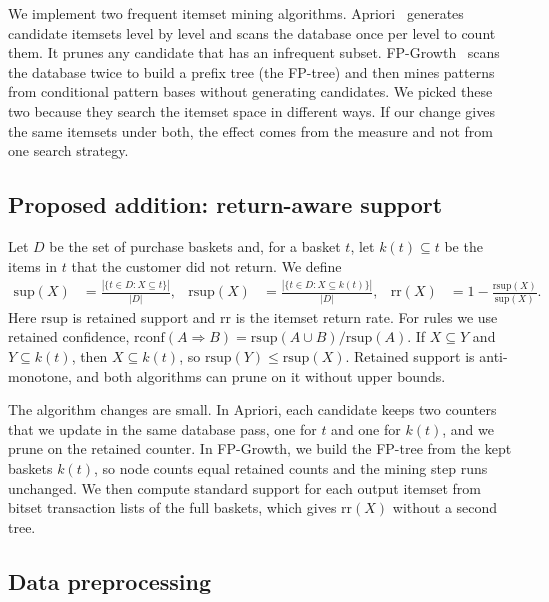 \documentclass[11pt,a4paper]{article}
\newcommand{\Sup}{\mathrm{sup}}
\newcommand{\RSup}{\mathrm{rsup}}
\begin{document}
We implement two frequent itemset mining algorithms. Apriori~\cite{agrawal1994} generates candidate itemsets level by level and scans the database once per level to count them. It prunes any candidate that has an infrequent subset. FP-Growth~\cite{han2000} scans the database twice to build a prefix tree (the FP-tree) and then mines patterns from conditional pattern bases without generating candidates. We picked these two because they search the itemset space in different ways. If our change gives the same itemsets under both, the effect comes from the measure and not from one search strategy.

\subsection*{Proposed addition: return-aware support}

Let $D$ be the set of purchase baskets and, for a basket $t$, let $k(t) \subseteq t$ be the items in $t$ that the customer did not return. We define
\begin{align*}
\Sup(X)  &= \frac{|\{t \in D : X \subseteq t\}|}{|D|}, &
\RSup(X) &= \frac{|\{t \in D : X \subseteq k(t)\}|}{|D|}, &
\mathrm{rr}(X) &= 1 - \frac{\RSup(X)}{\Sup(X)}.
\end{align*}
Here $\RSup$ is retained support and $\mathrm{rr}$ is the itemset return rate. For rules we use retained confidence, $\mathrm{rconf}(A \Rightarrow B) = \RSup(A \cup B) / \RSup(A)$. If $X \subseteq Y$ and $Y \subseteq k(t)$, then $X \subseteq k(t)$, so $\RSup(Y) \le \RSup(X)$. Retained support is anti-monotone, and both algorithms can prune on it without upper bounds.

The algorithm changes are small. In Apriori, each candidate keeps two counters that we update in the same database pass, one for $t$ and one for $k(t)$, and we prune on the retained counter. In FP-Growth, we build the FP-tree from the kept baskets $k(t)$, so node counts equal retained counts and the mining step runs unchanged. We then compute standard support for each output itemset from bitset transaction lists of the full baskets, which gives $\mathrm{rr}(X)$ without a second tree.

\subsection*{Data preprocessing}
\end{document}
